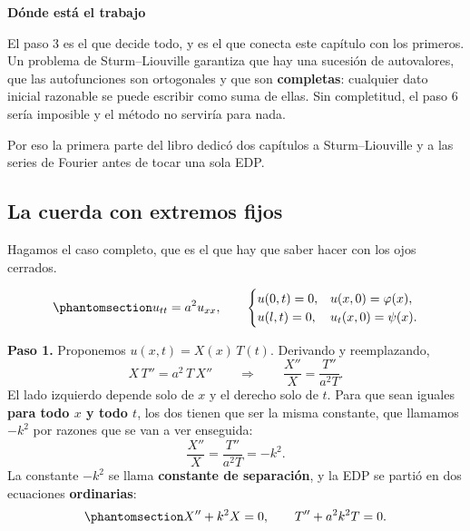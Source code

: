 \documentclass[
  spanish,
  a4paper,
]{scrbook}
\theoremstyle{definition}
\theoremstyle{plain}
\theoremstyle{definition}
\theoremstyle{plain}
\theoremstyle{definition}
\theoremstyle{remark}
\begin{document}
\begin{tcolorbox}[enhanced jigsaw, arc=.35mm, bottomrule=.15mm, breakable, colback=white, colframe=quarto-callout-tip-color-frame, left=2mm, leftrule=.75mm, opacityback=0, rightrule=.15mm, toprule=.15mm]
\begin{minipage}[t]{5.5mm}
\textcolor{quarto-callout-tip-color}{\faLightbulb}
\end{minipage}%
\begin{minipage}[t]{\textwidth - 5.5mm}

\vspace{-3mm}\textbf{Dónde está el trabajo}\vspace{3mm}

El paso 3 es el que decide todo, y es el que conecta este capítulo con
los primeros. Un problema de Sturm--Liouville garantiza que hay una
sucesión de autovalores, que las autofunciones son ortogonales y que son
\textbf{completas}: cualquier dato inicial razonable se puede escribir
como suma de ellas. Sin completitud, el paso 6 sería imposible y el
método no serviría para nada.

Por eso la primera parte del libro dedicó dos capítulos a
Sturm--Liouville y a las series de Fourier antes de tocar una sola EDP.

\end{minipage}%
\end{tcolorbox}

\subsection{La cuerda con extremos fijos}\label{sec-cuerda-separacion}

Hagamos el caso completo, que es el que hay que saber hacer con los ojos
cerrados.

\begin{equation}\protect\phantomsection\label{eq-cuerda-separacion}{
u_{tt} = a^2u_{xx}, \qquad
\begin{cases}
u(0,t) = 0, & u(x,0) = \varphi(x),\\
u(l,t) = 0, & u_t(x,0) = \psi(x).
\end{cases}
}\end{equation}

\textbf{Paso 1.} Proponemos \(u(x,t) = X(x)\,T(t)\). Derivando y
reemplazando, \[
X\,T'' = a^2\,T\,X'' \qquad\Longrightarrow\qquad \frac{X''}{X} = \frac{T''}{a^2T} .
\] El lado izquierdo depende solo de \(x\) y el derecho solo de \(t\).
Para que sean iguales \textbf{para todo \(x\) y todo \(t\)}, los dos
tienen que ser la misma constante, que llamamos \(-k^2\) por razones que
se van a ver enseguida: \[
\frac{X''}{X} = \frac{T''}{a^2T} = -k^2 .
\] La constante \(-k^2\) se llama \textbf{constante de separación}, y la
EDP se partió en dos ecuaciones \textbf{ordinarias}:
\begin{equation}\protect\phantomsection\label{eq-separadas}{
X'' + k^2X = 0, \qquad T'' + a^2k^2T = 0 .
}\end{equation}
\end{document}
